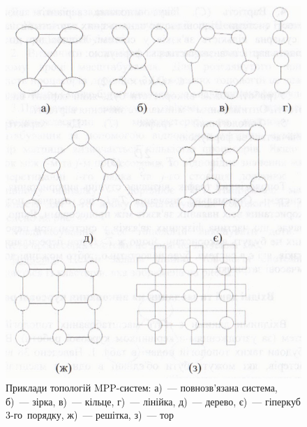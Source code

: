 \documentclass[
	a4paper,
	oneside,
	BCOR = 10mm,
	DIV = 12,
	12pt,
	headings = normal,
]{scrartcl}
\begin{document}
		\begin{figure}[!htbp]
			\centering
			\includegraphics[height = 12\baselineskip]{./assets/y03s02-compsys-coursework-01-p00-mpp-topology-types.jpg}
			\caption{Приклади топологій \textenglish{MPP}-систем: а)~— повнозв'язана система, б)~— зірка, в)~— кільце, г)~— лінійка, д)~— дерево, є)~— гіперкуб 3-го~порядку, ж)~— решітка, з)~— тор}
			\label{fig:mpp-topology-types}
		\end{figure}
\end{document}
